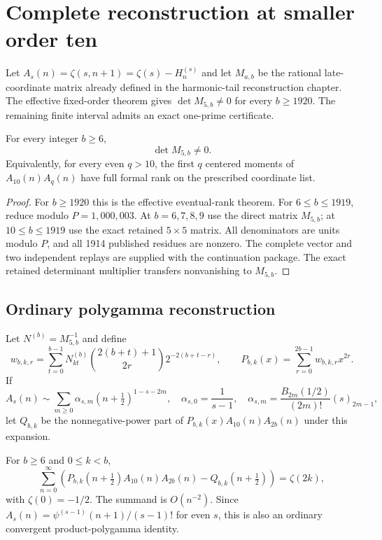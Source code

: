 
\section{Complete reconstruction at smaller order ten}
\label{otc:sec:rank}

Let $A_s(n)=\zeta(s,n+1)=\zeta(s)-H_n^{(s)}$ and let $M_{a,b}$ be the
rational late-coordinate matrix already defined in the harmonic-tail
reconstruction chapter.  The effective fixed-order theorem gives
$\det M_{5,b}\ne0$ for every $b\ge1920$.  The remaining finite interval
admits an exact one-prime certificate.

\begin{theorem}
\label{otc:thm:rank}
For every integer $b\ge6$,
\[
  \det M_{5,b}\ne0.
\]
Equivalently, for every even $q>10$, the first $q$ centered moments of
$A_{10}(n)A_q(n)$ have full formal rank on the prescribed coordinate
list.
\end{theorem}

\begin{proof}
For $b\ge1920$ this is the effective eventual-rank theorem.  For
$6\le b\le1919$, reduce modulo $P=1{,}000{,}003$.  At $b=6,7,8,9$ use
the direct matrix $M_{5,b}$; at $10\le b\le1919$ use the exact retained
$5\times5$ matrix.  All denominators are units modulo $P$, and all 1914
published residues are nonzero.  The complete vector and two independent
replays are supplied with the continuation package.  The exact retained
determinant multiplier transfers nonvanishing to $M_{5,b}$.
\end{proof}

\subsection{Ordinary polygamma reconstruction}

Let $N^{(b)}=M_{5,b}^{-1}$ and define
\[
 w_{b,k,r}=\sum_{t=0}^{b-1}N^{(b)}_{kt}
 \binom{2(b+t)+1}{2r}2^{-2(b+t-r)},
 \qquad
 P_{b,k}(x)=\sum_{r=0}^{2b-1}w_{b,k,r}x^{2r}.
\]
If
\[
 A_s(n)\sim\sum_{m\ge0}\alpha_{s,m}(n+\tfrac12)^{1-s-2m},
 \quad
 \alpha_{s,0}=\frac1{s-1},\quad
 \alpha_{s,m}=\frac{B_{2m}(1/2)}{(2m)!}(s)_{2m-1},
\]
let $Q_{b,k}$ be the nonnegative-power part of
$P_{b,k}(x)A_{10}(n)A_{2b}(n)$ under this expansion.

\begin{theorem}
\label{otc:thm:ordinary}
For $b\ge6$ and $0\le k<b$,
\[
 \sum_{n=0}^{\infty}\left(
 P_{b,k}(n+\tfrac12)A_{10}(n)A_{2b}(n)
 -Q_{b,k}(n+\tfrac12)\right)=\zeta(2k),
\]
with $\zeta(0)=-1/2$.  The summand is $O(n^{-2})$.  Since
$A_s(n)=\psi^{(s-1)}(n+1)/(s-1)!$ for even $s$, this is also an
ordinary convergent product-polygamma identity.
\end{theorem}

